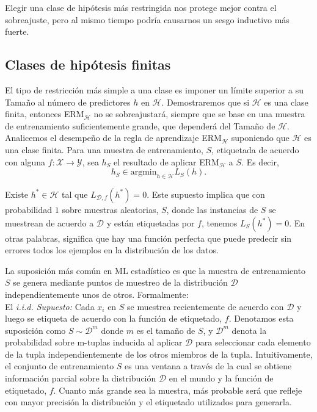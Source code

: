 Elegir una clase de hipótesis más restringida nos protege mejor contra el sobreajuste, pero al mismo tiempo podría causarnos un sesgo inductivo más fuerte.


\subsection{Clases de hipótesis finitas}
El tipo de restricción más simple a una clase es imponer un límite superior a su Tamaño al número de predictores $h$ en $\mathcal{H}$. Demostraremos que si $\mathcal{H}$ es una clase finita, entonces ERM$_\mathcal{H}$ no se sobreajustará, siempre que se base en una muestra de entrenamiento suficientemente grande, que dependerá del Tamaño de $\mathcal{H}$.\\

Analicemos el desempeño de la regla de aprendizaje ERM$_\mathcal{H}$ suponiendo que $\mathcal{H}$ es una clase finita. Para una muestra de entrenamiento, $S$, etiquetada de acuerdo con alguna $f:\mathcal{X}\to \mathcal{Y}$, sea $h_S$ el resultado de aplicar ERM$_\mathcal{H}$ a $S$. Es decir,
\begin{equation}
    h_S \in \text{argmin}_{h\in \mathcal{H}} L_S(h).
\end{equation}

\begin{def.} Existe $h^*\in \mathcal{H}$ tal que $L_{\mathcal{D},f}(h^*) = 0$. Este supuesto implica que con probabilidad $1$ sobre muestras aleatorias, $S$, donde las instancias de $S$ se muestrean de acuerdo a $\mathcal{D}$ y están etiquetadas por $f$, tenemos $L_S(h^*)=0$. En otras palabras, significa que hay una función perfecta que puede predecir sin errores todos los ejemplos en la distribución de los datos.
\end{def.}

La suposición más común en ML estadístico es que la muestra de entrenamiento $S$ se genera mediante puntos de muestreo de la distribución $\mathcal{D}$ independientemente unos de otros. Formalmente:\\

El \textit{i.i.d. Supuesto:} Cada $x_i$ en $S$ se muestrea recientemente de acuerdo con $\mathcal{D}$ y luego se etiqueta de acuerdo con la función de etiquetado, $f$. Denotamos esta suposición como $S \sim \mathcal{D}^m$ donde $m$ es el tamaño de $S$, y $\mathcal{D}^m$ denota la probabilidad sobre m-tuplas inducida al aplicar $\mathcal{D}$ para seleccionar cada elemento de la tupla independientemente de los otros miembros de la tupla. Intuitivamente, el conjunto de entrenamiento $S$ es una ventana a través de la cual se obtiene información parcial sobre la distribución $\mathcal{D}$ en el mundo y la función de etiquetado, $f$. Cuanto más grande sea la muestra, más probable será que refleje con mayor precisión la distribución y el etiquetado utilizados para generarla.\\



